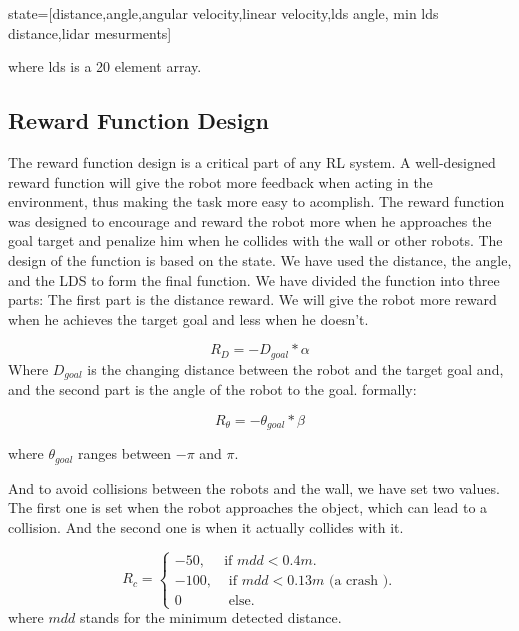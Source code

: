\documentclass[12pt]{extarticle}
\begin{document}
state=[distance,angle,angular velocity,linear velocity,lds angle,
min lds distance,lidar mesurments]

where lds is a 20 element array.

\subsection{Reward Function Design}

The reward function design is a critical part of any RL system. A well-designed reward function will give the robot more feedback when acting in the environment, thus making the task more easy to acomplish.
The reward function was designed to encourage and reward the robot more when he approaches the goal target and penalize him when he collides with the wall or other robots.
The design of the function is based on the state. We have used the distance, the angle, and the LDS to form the final function.
We have divided the function into three parts: The first part is the distance reward. We will give the robot more reward when he achieves the target goal and less when he doesn't.
   
\setcounter{equation}{0}

       \begin{equation} \label{dist_r}
     R_{D}=-D_{goal}*\alpha
   \end{equation}
 Where $D_{goal}$ is the changing distance between the robot and the target goal and, and the second part is the angle of the robot to the goal. formally:


     \begin{equation} \label{angle_r}
     R_{\theta}=-\theta_{goal}*\beta
   \end{equation}
 
 where $\theta_{goal}$  ranges  between $-\pi$  and $\pi$.
 
And to avoid collisions between the robots and the wall, we have set two values. The first one is set when the robot approaches the object, which can lead to a collision. And the second one is when it actually collides with it.


\begin{equation}  \label{obs_r}
  R_{c}=\begin{cases}
    -50, & \text{if $mdd< 0.4m$}.\\
    -100 , & \text{ if $mdd <0.13m$ (a crash )}.\\
    0 & \text{ else}.
  \end{cases}
\end{equation}
where $mdd$ stands for the minimum detected distance.\linebreak
\end{document}
